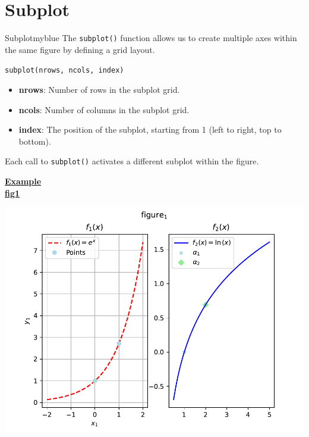 \vspace{0.5cm}

\section{Subplot}
\begin{prettyBox}{Subplot}{myblue}
The \texttt{subplot()} function allows us to create multiple axes within the same figure by defining a grid layout.  

\texttt{subplot(nrows, ncols, index)}

\begin{itemize}
    \item \textbf{nrows}: Number of rows in the subplot grid.
    \item \textbf{ncols}: Number of columns in the subplot grid.
    \item \textbf{index}: The position of the subplot, starting from 1 (left to right, top to bottom).
\end{itemize}

Each call to \texttt{subplot()} activates a different subplot within the figure.  
\end{prettyBox}

\newpage
\textbf{\underline{Example}}\\[0.1cm]


\newpage
\textbf{\underline{fig1}}\\[0.1cm]
\begin{center}
    \includegraphics[height=0.35\textheight]{Chapters/Code/PLT/fig1.pdf}
\end{center}


